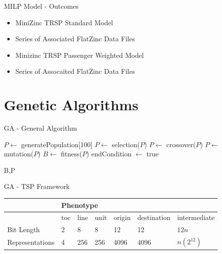 \documentclass[aspectratio=169]{beamer}
\begin{document}
\begin{frame}{MILP Model - Outcomes}
    \begin{itemize}
        \item MiniZinc TRSP Standard Model
        \item Series of Associated FlatZinc Data Files
        \item Minizinc TRSP Passenger Weighted Model
        \item Series of Assocaited FlatZinc Data Files
    \end{itemize}
\end{frame}

\section{Genetic Algorithms}
\begin{frame}{GA - General Algorithm}
    \begin{algorithmic}
        \State $P \gets$ generatePopulation[100]  
            \State $P \gets $ selection($P$)
            \State $P \gets $ crossover($P$)
            \State $P \gets $ mutation($P$)
            \State $B \gets $ fitness($P$)
               \State endCondition $\gets$ true
            \EndIf
        \EndWhile
        
        \Return B,P
    \end{algorithmic}
\end{frame}

\begin{frame}{GA - TSP Framework}
    \begin{table}[]
        \begin{tabular}{|l|lll|lll|}
        \hline
                        & \multicolumn{6}{l}{Phenotype}                                          \\
        \hline
                        & toc & line & unit & origin & destination & intermediate                \\
        \hline
        Bit Length      & 2   & 8    & 8    & 12     & 12          & $12n$                       \\
        Representations & 4   & 256  & 256  & 4096   & 4096        & $n(2^{12})$                    \\
        \hline
        \end{tabular}
    \end{table}
\end{frame}
\end{document}
